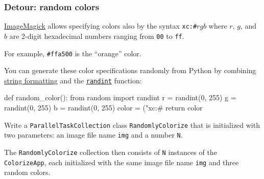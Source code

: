 \documentclass[english,serif,mathserif,xcolor=pdftex,dvipsnames,table]{beamer}
\begin{document}
\begin{frame}[fragile]
  \frametitle{Detour: random colors}

  \href{http://www.imagemagick.org/script/color.php}{ImageMagick}
  allows specifying colors also by the syntax \texttt{xc:\#}$rgb$ where
  $r$, $g$, and $b$ are 2-digit hexadecimal numbers ranging from
  \texttt{00} to \texttt{ff}.

  \+
  For example, \texttt{\#ffa500} is the ``orange'' color.

  \+ You can generate these color specifications randomly from Python
  by combining \href{https://pyformat.info/}{string formatting} and the
  \href{https://docs.python.org/2/library/random.html#random.randint}{\texttt{randint}}
  function:
\begin{python}
  def random_color():
    from random import randint
    r = randint(0, 255)
    g = randint(0, 255)
    b = randint(0, 255)
    color = ("xc:#%
    return color
\end{python}
\end{frame}


\begin{frame}
\begin{exercise*}[9.A]
  Write a \texttt{ParallelTaskCollection} class
  \texttt{RandomlyColorize} that is initialized with two parameters:
  an image file name \texttt{img} and a number \texttt{N}.

  \+
  The \texttt{RandomlyColorize} collection then consists of
  \texttt{N} instances of the \texttt{ColorizeApp}, each initialized
  with the same image file name \texttt{img} and three random colors.
\end{exercise*}
\end{frame}
\end{document}
